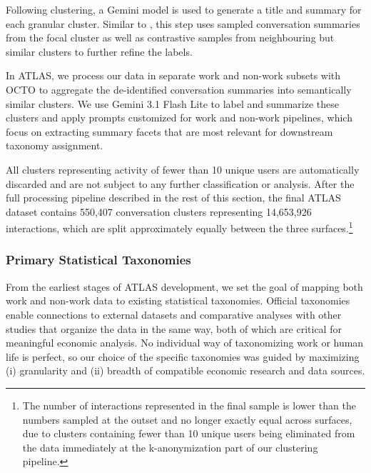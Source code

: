 \documentclass[11pt,a4paper]{article}
\begin{document}
Following clustering, a Gemini model is used to generate a title and summary for each granular cluster. Similar to \citet{tamkin2024clioprivacypreservinginsightsrealworld}, this step uses sampled conversation summaries from the focal cluster as well as contrastive samples from neighbouring but similar clusters to further refine the labels.

In ATLAS, we process our data in separate work and non-work subsets with OCTO to aggregate the de-identified conversation summaries into semantically similar clusters. We use Gemini 3.1 Flash Lite to label and summarize these clusters and apply prompts customized for work and non-work pipelines, which focus on extracting summary facets that are most relevant for downstream taxonomy assignment.

All clusters representing activity of fewer than 10 unique users are automatically discarded and are not subject to any further classification or analysis. After the full processing pipeline described in the rest of this section, the final ATLAS dataset contains 550,407 conversation clusters representing 14,653,926 interactions, which are split approximately equally between the three surfaces.\footnote{The number of interactions represented in the final sample is lower than the numbers sampled at the outset and no longer exactly equal across surfaces, due to clusters containing fewer than 10 unique users being eliminated from the data immediately at the k-anonymization part of our clustering pipeline.}

\subsubsection{Primary Statistical Taxonomies}
From the earliest stages of ATLAS development, we set the goal of mapping both work and non-work data to existing statistical taxonomies. Official taxonomies enable connections to external datasets and comparative analyses with other studies that organize the data in the same way, both of which are critical for meaningful economic analysis. No individual way of taxonomizing work or human life is perfect, so our choice of the specific taxonomies was guided by maximizing (i) granularity and (ii) breadth of compatible economic research and data sources.
\end{document}
